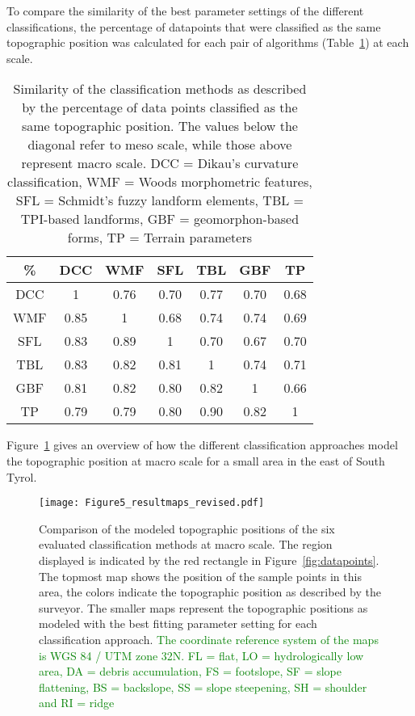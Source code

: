 \documentclass[preprint,12pt,authoryear]{elsarticle}
\begin{document}
To compare the similarity of the best parameter settings of the different classifications, the percentage of datapoints that were classified as the same topographic position was calculated for each pair of algorithms (Table~\ref{table:similarity_matrix}) at each scale. 
\begin{table}[ht]
\caption{Similarity of the classification methods as described by the percentage of data points classified as the same topographic position. The values below the diagonal refer to meso scale, while those above represent macro scale. DCC = Dikau's curvature classification, WMF = Woods morphometric features, SFL = Schmidt's fuzzy landform elements, TBL = TPI-based landforms, GBF = geomorphon-based forms, TP = Terrain parameters}
\centering
\begin{tabular}{ccccccc}
  \hline
\%  & DCC & WMF &SFL &TBL & GBF & TP \\ 
  \hline
DCC &1 & 0.76 & 0.70 & 0.77 & 0.70 & 0.68 \\ 
WMF &0.85  & 1 & 0.68 & 0.74 & 0.74 & 0.69 \\ 
SFL & 0.83 & 0.89 & 1 & 0.70 & 0.67 & 0.70 \\ 
TBL & 0.83 &0.82  &0.81  & 1 & 0.74 & 0.71 \\ 
GBF &0.81  &0.82  & 0.80  & 0.82 & 1 & 0.66 \\ 
TP &0.79  &0.79  &0.80  &0.90  &0.82  & 1 \\ 
   \hline
\end{tabular}
\label{table:similarity_matrix}
\end{table}
Figure~\ref{fig:resultmaps} gives an overview of how the different classification approaches model the topographic position at macro scale for a small area in the east of South Tyrol.
\begin{figure}
\texttt{[image: Figure5\_resultmaps\_revised.pdf]}
\caption{Comparison of the modeled topographic positions of the six evaluated classification methods at macro scale. The region displayed is indicated by the red rectangle in Figure~\ref{fig:datapoints}. The topmost map shows the position of the sample points in this area, the colors indicate the topographic position as described by the surveyor. The smaller maps represent the topographic positions as modeled with the best fitting parameter setting for each classification approach. \textcolor{green}{The coordinate reference system of the maps is WGS 84 / UTM zone 32N.  FL = flat, LO = hydrologically low area, DA = debris accumulation, FS = footslope, SF = slope flattening, BS = backslope, SS = slope steepening, SH = shoulder and RI = ridge}}
\label{fig:resultmaps}
\end{figure}
\end{document}
